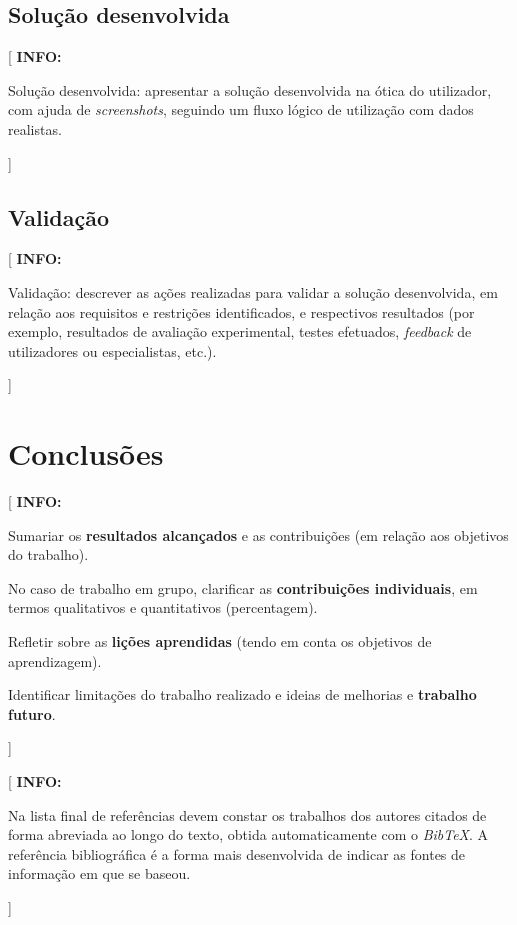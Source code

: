\documentclass[11pt,a4paper]{report}
\newcommand{\class}[1]{{\normalfont\slshape #1\/}}
\newenvironment{info}[1]{\vspace*{6mm}\color{blue}
                            [ \textbf{INFO:} \begin{em} #1}
                        {\vspace*{3mm}\end{em} ]}
\begin{document}
\section{Solução desenvolvida}

\begin{info}
Solução desenvolvida: apresentar a solução desenvolvida na ótica do
utilizador, com ajuda de \emph{screenshots}, seguindo um fluxo lógico
de utilização com dados realistas.
\end{info}

\section{Validação}

\begin{info}
Validação: descrever as ações realizadas para validar a solução
desenvolvida, em relação aos requisitos e restrições identificados, e 
respectivos resultados (por exemplo, resultados de avaliação
experimental, testes efetuados, \emph{feedback} de utilizadores ou
especialistas, etc.). 
\end{info}


\chapter{Conclusões}

\begin{info}
Sumariar os \textbf{resultados alcançados} e as contribuições (em
relação aos objetivos do trabalho).

No caso de trabalho em grupo, clarificar as \textbf{contribuições
  individuais}, em termos qualitativos e quantitativos (percentagem).

Refletir sobre as \textbf{lições aprendidas} (tendo em conta os
objetivos de aprendizagem).

Identificar limitações do trabalho realizado e ideias de melhorias e
\textbf{trabalho futuro}. 
\end{info}



\renewcommand{\bibname}{Referências bibliográficas}



\begin{info}
Na lista final de referências devem constar os trabalhos dos autores
citados de forma abreviada ao longo do texto, obtida automaticamente
com o \class{BibTeX}.
A referência bibliográfica é a forma mais desenvolvida de indicar as
fontes de informação em que se baseou. 
\end{info}
\end{document}
